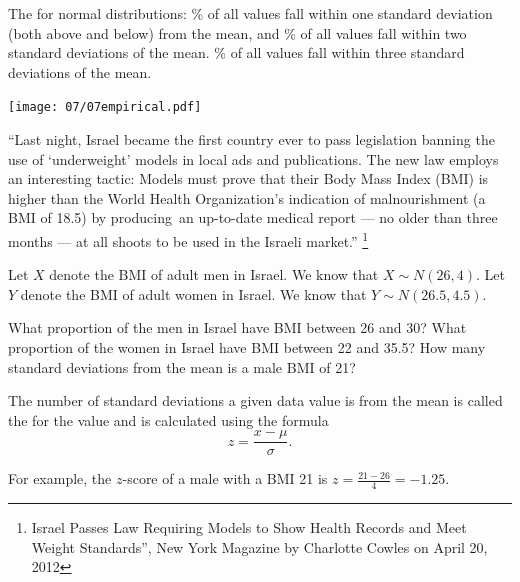 \begin{tcolorbox}
\begin{multicols}{2}
The \textbf{} for normal distributions:
\bi
{}\% of all values fall within one standard deviation (both above and below) from the mean, and 
\% of all values fall within two standard deviations of the mean.
\% of all values fall within three standard deviations of the mean.
\ei

\columnbreak

\texttt{[image: 07/07empirical.pdf]}

\end{multicols}
\end{tcolorbox}

\bb[resume]
\ii ``Last night, Israel became the first country ever to pass legislation banning the use of ‘underweight’ models in local ads and publications. The new law employs an interesting tactic: Models must prove that their Body Mass Index (BMI) is higher than the World Health Organization's indication of malnourishment (a BMI of 18.5) by producing an up-to-date medical report — no older than three months — at all shoots to be used in the Israeli market.'' \footnote{Israel Passes Law Requiring Models to Show Health Records and Meet Weight Standards”, New York Magazine by Charlotte Cowles on April 20, 2012}\label{BMI}

\bi
\ii Let $X$ denote the BMI of adult men in Israel. We know that $X \sim N(26,4)$.
\ii Let $Y$ denote the BMI of adult women in Israel. We know that $Y \sim N(26.5,4.5)$.
\ei

\bb
\ii What proportion of the men in Israel have BMI between 26 and 30? \vfill
\ii What proportion of the women in Israel have BMI between 22 and 35.5? \vfill
\ii How many standard deviations from the mean is a male BMI of 21? \vfill
\ee
\ee

\clearpage


\begin{tcolorbox}
\begin{definition}\label{def:zscore}
The number of standard deviations a given data value is from the mean is called the
\textbf{} for the value and is calculated using the formula
\[ z = \frac{x-\mu}{\sigma}.\]
\end{definition}
\end{tcolorbox}

For example, the $z$-score of a male with a BMI 21 is $z=\frac{21-26}{4} = -1.25$.

